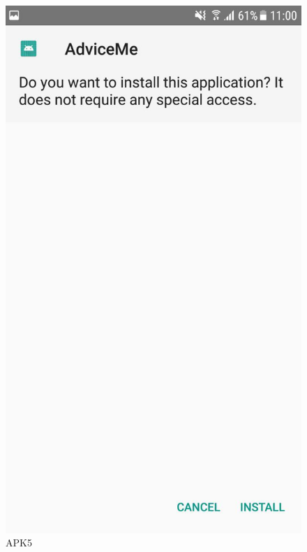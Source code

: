 \begin{figure}[h!]
\begin{minipage}[t]{0.48\textwidth}
\includegraphics[width=\linewidth,keepaspectratio=true]{img/apk5.jpg}
\caption{APK5}
\label{fig:APK5}
\end{minipage}
\hspace*{\fill} %
\begin{minipage}[t]{0.48\textwidth}

\end{minipage}
\end{figure}
